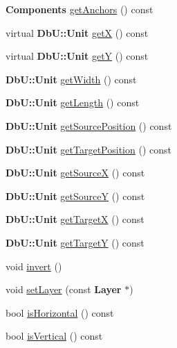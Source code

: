 \begin{DoxyCompactItemize}
\item 
\textbf{ Components} \mbox{\hyperlink{classKatabatic_1_1AutoSegment_a7339a1ebc7d46384bc4e1317af84bea1}{get\+Anchors}} () const
\item 
virtual \textbf{ Db\+U\+::\+Unit} \mbox{\hyperlink{classKatabatic_1_1AutoSegment_a00b8f54c8171f6699e57de1b8c18eeb1}{getX}} () const
\item 
virtual \textbf{ Db\+U\+::\+Unit} \mbox{\hyperlink{classKatabatic_1_1AutoSegment_a4580de6b074712e400d5d238ce3af054}{getY}} () const
\item 
\textbf{ Db\+U\+::\+Unit} \mbox{\hyperlink{classKatabatic_1_1AutoSegment_a9c63fe7288748eaf5332ca796a36d872}{get\+Width}} () const
\item 
\textbf{ Db\+U\+::\+Unit} \mbox{\hyperlink{classKatabatic_1_1AutoSegment_ab1ca7adfc68761c749a16f65c9aa4088}{get\+Length}} () const
\item 
\textbf{ Db\+U\+::\+Unit} \mbox{\hyperlink{classKatabatic_1_1AutoSegment_a8a88dc051a8d324aff8763609957dcaa}{get\+Source\+Position}} () const
\item 
\textbf{ Db\+U\+::\+Unit} \mbox{\hyperlink{classKatabatic_1_1AutoSegment_a65dea76b4efad9d3caa78be44e96c94c}{get\+Target\+Position}} () const
\item 
\textbf{ Db\+U\+::\+Unit} \mbox{\hyperlink{classKatabatic_1_1AutoSegment_a8a8e127557d70de70f9efb488be30d1a}{get\+SourceX}} () const
\item 
\textbf{ Db\+U\+::\+Unit} \mbox{\hyperlink{classKatabatic_1_1AutoSegment_ae913463a76d08b079611a993cebea1a9}{get\+SourceY}} () const
\item 
\textbf{ Db\+U\+::\+Unit} \mbox{\hyperlink{classKatabatic_1_1AutoSegment_a8e6462b43ca9eaeea1e08866cec59a8c}{get\+TargetX}} () const
\item 
\textbf{ Db\+U\+::\+Unit} \mbox{\hyperlink{classKatabatic_1_1AutoSegment_a003e545e792e8bf22d264bcb3bc90547}{get\+TargetY}} () const
\item 
void \mbox{\hyperlink{classKatabatic_1_1AutoSegment_acbac6289ab14574da20f26c933e2e741}{invert}} ()
\item 
void \mbox{\hyperlink{classKatabatic_1_1AutoSegment_aad4271c35e0162c8a4d034dca07f5a4b}{set\+Layer}} (const \textbf{ Layer} $\ast$)
\item 
bool \mbox{\hyperlink{classKatabatic_1_1AutoSegment_a21b9cefd33ae22e4c2070ad441bdd30b}{is\+Horizontal}} () const
\item 
bool \mbox{\hyperlink{classKatabatic_1_1AutoSegment_abd54544ef1710ee4b67cfb021d73446c}{is\+Vertical}} () const

\end{DoxyCompactItemize}

